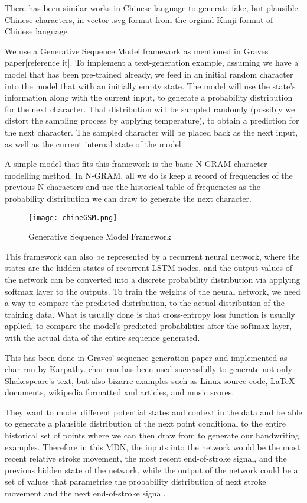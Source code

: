 \documentclass[12pt]{report}
\begin{document}
There has been similar works in Chinese language to generate fake, but
plausible Chinese characters, in vector .svg format from the orginal
Kanji format of Chinese language.

We use a Generative Sequence Model framework as mentioned in Graves
paper[reference it].
To implement a  text-generation example, assuming we have a model that
has been pre-trained already, we feed in an initial random character
into the model that with an initially empty state. The model will use
the state’s information along with the current input, to generate a
probability distribution for the next character. That distribution
will be sampled randomly (possibly we distort the sampling process by
applying temperature), to obtain a prediction for the next character.
The sampled character will be placed back as the next input, as well
as the current internal state of the model.

A simple model that fits this framework is the basic N-GRAM character
modelling method. In N-GRAM, all we do is keep a record of frequencies
of the previous N characters and use the historical table of
frequencies as the probability distribution we can draw to generate
the next character.

\begin{figure}[h]
\texttt{[image: chineGSM.png]}
\caption{Generative Sequence Model Framework}
\end{figure}

This framework can also be represented by a recurrent neural network,
where the states are the hidden states of recurrent LSTM nodes, and
the output values of the network can be converted into a discrete
probability distribution via applying softmax layer to the outputs. To
train the weights of the neural network, we need a way to compare the
predicted distribution, to the actual distribution of the training
data. What is usually done is that cross-entropy loss function is
usually applied, to compare the model’s predicted probabilities after
the softmax layer, with the actual data of the entire sequence
generated.

This has been done in Graves’ sequence generation paper and
implemented as char-rnn by Karpathy. char-rnn has been used
successfully to generate not only Shakespeare’s text, but also bizarre
examples such as Linux source code, LaTeX documents, wikipedia
formatted xml articles, and music scores.

They want to model different potential states and context in the data
and be able to generate a plausible distribution of the next point
conditional to the entire historical set of points where we can then
draw from to generate our handwriting examples. Therefore in this MDN,
the inputs into the network would be the most recent relative stroke
movement, the most recent end-of-stroke signal, and the previous
hidden state of the network, while the output of the network could be
a set of values that parametrise the probability distribution of next
stroke movement and the next end-of-stroke signal.
\end{document}
